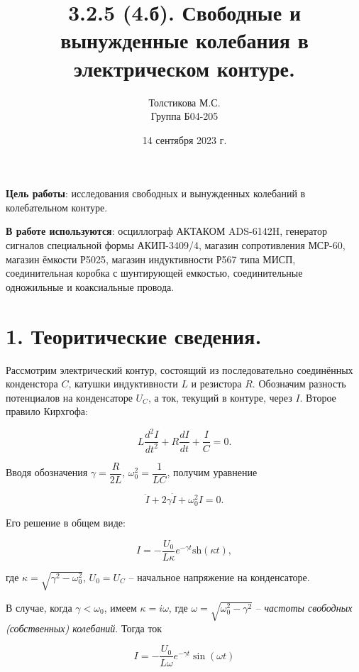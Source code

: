 \documentclass[a4paper,12pt]{article}
\author{Толстикова М.С.\\
Группа Б04-205}
\title{\textbf{3.2.5 (4.б). Свободные и вынужденные колебания в электрическом контуре.}}
\date{14 сентября 2023 г.}
\begin{document}
\maketitle

\leftskip=1cm \rightskip=1cm

\textbf{Цель работы}: исследования свободных и вынужденных колебаний в колебательном контуре.

\textbf{В работе используются}: осциллограф АКТАКОМ ADS-6142H, генератор сигналов специальной формы АКИП-3409/4, магазин сопротивления МСР-60, магазин ёмкости Р5025, магазин индуктивности Р567 типа МИСП, соединительная коробка с шунтирующей емкостью, соединительные одножильные и коаксиальные провода.

\leftskip=0cm \rightskip=0cm

\section*{1. Теоритические сведения.}

Рассмотрим электрический контур, состоящий из последовательно соединённых конденстора $C$, катушки индуктивности $L$ и резистора $R$. Обозначим разность потенциалов на конденсаторе $U_C$, а ток, текущий в контуре, через $I$. Второе правило Кирхгофа:

\begin{equation}
L \dfrac{d^2I}{dt^2}+R\dfrac{dI}{dt}+\dfrac{I}{C}=0.
\end{equation}

Вводя обозначения $\gamma = \dfrac{R}{2L}$, $\omega_0^2=\dfrac{1}{LC}$, получим уравнение

\begin{equation}
\ddot{I}+2\gamma\dot{I}+\omega_0^2I=0.
\end{equation}

Его решение в общем виде:

\begin{equation}
I = -\dfrac{U_0}{L\kappa}e^{-\gamma t}\text{sh}(\kappa t), 
\end{equation}

где $\kappa = \sqrt{\gamma^2 - \omega_0^2}$, $U_0 = U_C$ -- начальное напряжение на конденсаторе.

 В случае, когда $\gamma < \omega_0$, имеем $\kappa = i\omega$, где $\omega = \sqrt{\omega_0^2 - \gamma^2}$ -- \textit{частоты свободных (собственных) колебаний}. Тогда ток
 
 \begin{equation}
 I = -\dfrac{U_0}{L\omega}e^{-\gamma t}\sin(\omega t)
 \end{equation}
 
\end{document}
